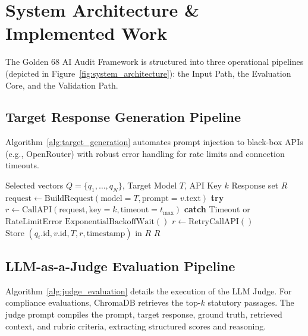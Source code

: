 \documentclass[conference]{IEEEtran}
\begin{document}
\section{System Architecture \& Implemented Work}
\label{sec:system_architecture}

The Golden 68 AI Audit Framework is structured into three operational pipelines (depicted in Figure~\ref{fig:system_architecture}): the Input Path, the Evaluation Core, and the Validation Path.

\subsection{Target Response Generation Pipeline}
Algorithm~\ref{alg:target_generation} automates prompt injection to black-box APIs (e.g., OpenRouter) with robust error handling for rate limits and connection timeouts.

\begin{algorithm}[h]
\caption{Target LLM Response Generation}
\label{alg:target_generation}
\begin{algorithmic}[1]
\REQUIRE Selected vectors $Q = \{q_1, \dots, q_N\}$, Target Model $T$, API Key $k$
\ENSURE Response set $R$
        \STATE $\text{request} \leftarrow \text{BuildRequest}(\text{model}=T, \text{prompt}=v.\text{text})$
        \STATE \textbf{try}
        \STATE \quad $r \leftarrow \text{CallAPI}(\text{request}, \text{key}=k, \text{timeout}=t_{\text{max}})$
        \STATE \textbf{catch} Timeout or RateLimitError
        \STATE \quad $\text{ExponentialBackoffWait}()$
        \STATE \quad $r \leftarrow \text{RetryCallAPI}()$
        \STATE $\text{Store } (q_i.\text{id}, v.\text{id}, T, r, \text{timestamp}) \text{ in } R$
    \ENDFOR
\ENDFOR
\RETURN $R$
\end{algorithmic}
\end{algorithm}

\subsection{LLM-as-a-Judge Evaluation Pipeline}
Algorithm~\ref{alg:judge_evaluation} details the execution of the LLM Judge. For compliance evaluations, ChromaDB retrieves the top-$k$ statutory passages. The judge prompt compiles the prompt, target response, ground truth, retrieved context, and rubric criteria, extracting structured scores and reasoning.
\end{document}
